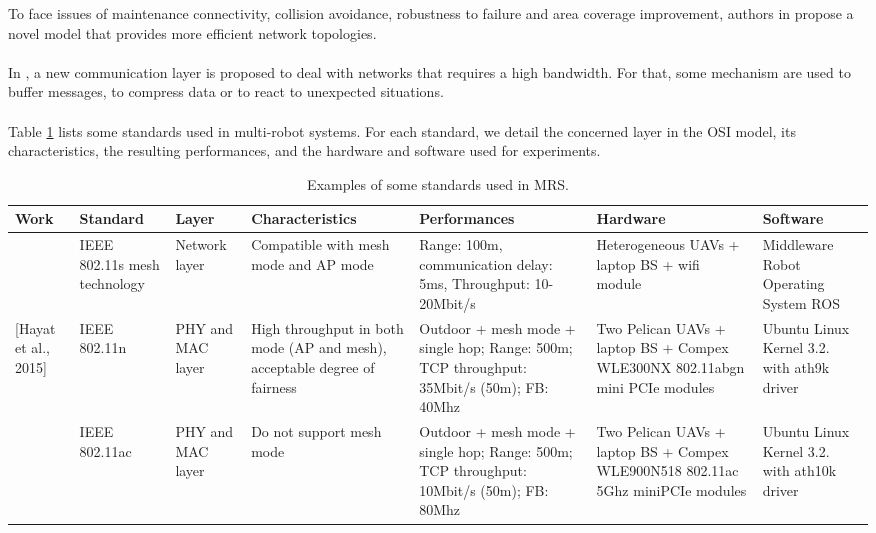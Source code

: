 \documentclass[11pt,openany]{book}
\begin{document}
\begin{algorimth}[H]
To face issues of maintenance connectivity, collision avoidance, robustness to failure and area coverage improvement, authors in \cite{ghedini2018toward} propose a novel model that provides more eﬃcient network topologies.\\\\
In \cite{harms2017development}, a new communication layer is proposed to deal with networks that requires a high bandwidth. For that, some mechanism are used to buﬀer messages, to compress data or to react to unexpected situations.\\\\
Table \ref{tab:4.3} lists some standards used in multi-robot systems. For each standard, we detail the concerned layer in the OSI model, its characteristics, the resulting performances, and the hardware and software used for experiments.
\begin{landscape}
    \begin{table}[H]
        \centering
        \caption{Examples of some standards used in MRS.}
        \label{tab:4.3}
        \begin{tabular}{|p{1.5cm}|p{1.7cm}|p{1.3cm}|p{2.9cm}|p{2.7cm}|p{2.3cm}|p{2cm}|}\hline
            \textbf{Work}                             & \textbf{Standard}            & \textbf{Layer}    & \textbf{Characteristics}                                                  & \textbf{Performances}                                                                    & \textbf{Hardware}                                                               & \textbf{Software}
            \\\hline
            [Scherer et al., 2015]                    & IEEE 802.11s mesh technology & Network layer     & Compatible with mesh mode and AP mode                                     & Range: 100m, communication delay: 5ms, Throughput: 10-20Mbit/s                           & Heterogeneous UAVs + laptop BS + wifi module                                    & Middleware Robot Operating System ROS       \\\hline
            \multirow{2}{1.5cm}{[Hayat et al., 2015]} & IEEE 802.11n                 & PHY and MAC layer & High throughput in both mode (AP and mesh), acceptable degree of fairness & Outdoor + mesh mode + single hop; Range: 500m; TCP throughput: 35Mbit/s (50m); FB: 40Mhz & Two Pelican UAVs + laptop BS + Compex WLE300NX 802.11abgn mini PCIe modules     & Ubuntu Linux Kernel 3.2. with ath9k driver  \\\cline{2-7}
                                                      & IEEE 802.11ac                & PHY and MAC layer & Do not support mesh mode                                                  & Outdoor + mesh mode + single hop; Range: 500m; TCP throughput: 10Mbit/s (50m); FB: 80Mhz & Two Pelican UAVs + laptop BS + Compex WLE900N518 802.11ac 5Ghz miniPCIe modules & Ubuntu Linux Kernel 3.2. with ath10k driver \\\hline

\end{tabular}
\end{table}
\end{landscape}
\end{algorimth}
\end{document}
